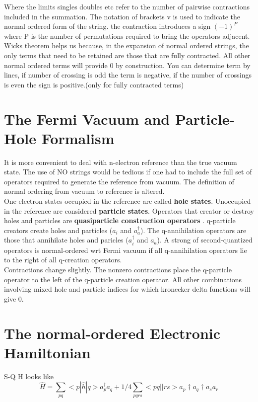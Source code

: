 \documentclass[10pt, draft]{article}
\begin{document}
Where the limits singles doubles etc refer to the number of pairwise contractions included in the summation.  The notation of brackets v is used to indicate the normal ordered form of the string.   the contraction introduces a sign $(-1)^P$ where P is the number of permutations required to bring the operators adjacent.  \\
Wicks theorem helps us because, in the expansion of normal ordered strings, the only terms that need to be retained are those that are fully contracted.  All other normal ordered terms will provide 0 by construction.  You can determine term by lines, if number of crossing is odd the term is negative, if the number of crossings is even the sign is positive.(only for fully contracted terms)

\section{The Fermi Vacuum and Particle-Hole Formalism}
It is more convenient to deal with n-electron reference than the true vacuum state.  The use of NO strings would be tedious if one had to include the full set of operators required to generate the reference from vacuum.  The definition of normal ordering from vacuum to reference is altered.  \\
One electron states occupied in the reference are called \textbf{hole states}.  Unoccupied in the reference are considered \textbf{particle states}.  Operators that creator or destroy holes and particles are \textbf{quasiparticle construction operators} . q-particle creators create holes and particles ($a_i$ and $a_a^\dagger$).  The q-annihilation operators are those that annihilate holes and paricles ($a_i^\dagger$ and $a_a$).  A strong of second-quantized operators is normal-ordered wrt Fermi vacuum if all q-annihilation operators lie to the right of all q-creation operators.\\
Contractions change slightly.  The nonzero contractions place the q-particle operator to the left of the q-particle creation operator.  All other combinations involving mixed hole and particle indices for which kronecker delta functions will give 0.

\section{The normal-ordered Electronic Hamiltonian}

S-Q H looks like 
\[ \hat{H} = \sum_{pq} <p|\hat{h}|q> a_p^\dagger a_q + 1/4 \sum_{pqrs} <pq||rs> a_p\dagger a_q\dagger a_s a_r \]
\end{document}
